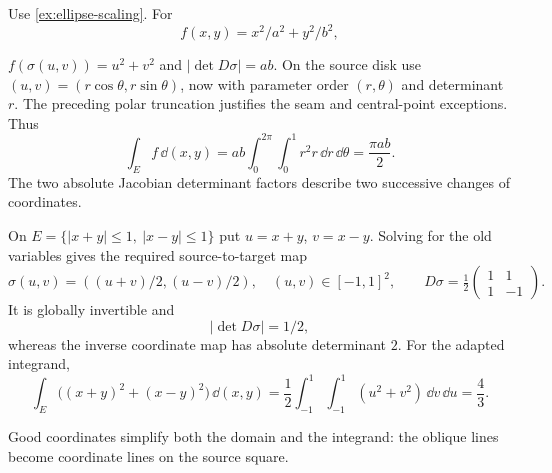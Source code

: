 \begin{example}
Use \cref{ex:ellipse-scaling}. For
\[
f(x,y)=x^2/a^2+y^2/b^2,
\]

$f(\sigma(u,v))=u^2+v^2$ and $|\det D\sigma|=ab$. On the source disk
use $(u,v)=(r\cos\theta,r\sin\theta)$, now with parameter order
$(r,\theta)$ and determinant $r$. The preceding polar truncation justifies
the seam and central-point exceptions. Thus
\[
\int_E f\,\dd(x,y)=ab\int_0^{2\pi}\int_0^1 r^2r\,\dd r\,\dd\theta
=\frac{\pi ab}{2}.
\]
The two absolute Jacobian determinant factors describe two successive changes of coordinates.
\end{example}
\begin{example}
On $E=\{|x+y|\leq1,\ |x-y|\leq1\}$ put $u=x+y$, $v=x-y$.
Solving for the old variables gives the required source-to-target map
\[
\sigma(u,v)=((u+v)/2,(u-v)/2),\quad (u,v)\in[-1,1]^2,
\qquad D\sigma=\tfrac12\begin{pmatrix}1&1\\1&-1\end{pmatrix}.
\]
It is globally invertible and
\[
|\det D\sigma|=1/2,
\]
 whereas the inverse
coordinate map has absolute determinant $2$. For the adapted integrand,
\[
\int_E\bigl((x+y)^2+(x-y)^2\bigr)\,\dd(x,y)
=\frac12\int_{-1}^1\int_{-1}^1(u^2+v^2)\,\dd v\,\dd u=\frac43.
\]
\noindent\begin{minipage}{\linewidth}
\begin{center}
\end{center}
Good coordinates simplify both the domain and the integrand: the oblique
lines become coordinate lines on the source square.
\end{minipage}
\end{example}
